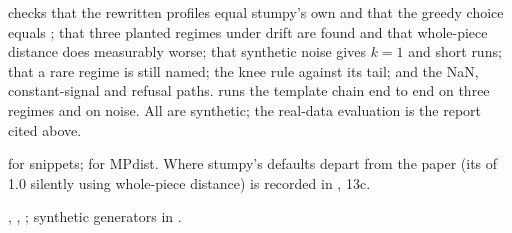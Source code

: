  checks that the rewritten profiles equal stumpy's own and that the
greedy choice equals ; that three planted regimes under drift are found and
that whole-piece distance does measurably worse; that synthetic noise gives $k = 1$ and short runs;
that a rare regime is still named; the knee rule against its tail; and the NaN, constant-signal and
refusal paths.  runs the template chain end to end on
three regimes and on noise. All are synthetic; the real-data evaluation is the report cited above.

\citet{imani2018matrix} for snippets; \citet{gharghabi2018matrix} for MPdist. Where stumpy's
defaults depart from the paper (its  of 1.0 silently using whole-piece distance) is
recorded in , 13c.

, ,
; synthetic generators in
.
